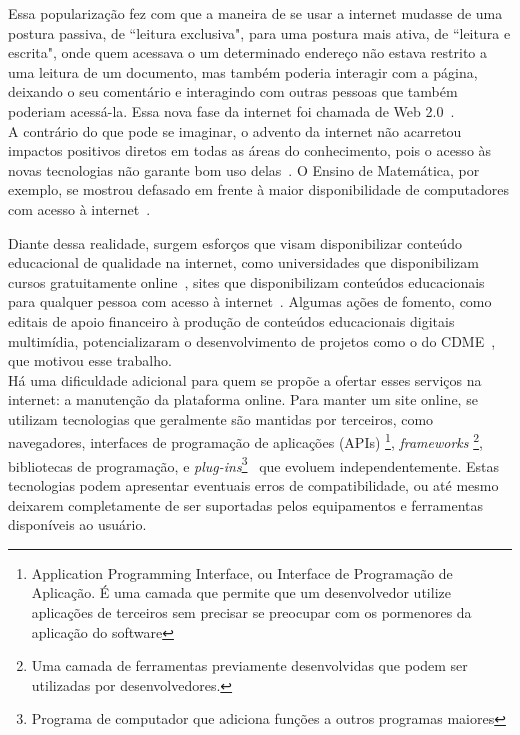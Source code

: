 Essa popularização fez com que a maneira de se usar a internet mudasse de uma postura passiva, de ``leitura exclusiva", para uma postura mais ativa, de ``leitura e escrita", onde quem acessava o um determinado endereço não estava restrito a uma leitura de um documento, mas também poderia interagir com a página, deixando o seu comentário e interagindo com outras pessoas que também poderiam acessá-la. Essa nova fase da internet foi chamada de Web 2.0~\cite{web20jones2013patterns}.\\ 
 
A contrário do que pode se imaginar, o advento da internet não acarretou impactos positivos diretos em todas as áreas do conhecimento, pois o acesso às novas tecnologias não garante bom uso delas~\cite{lei2007technology}. O Ensino de Matemática, por exemplo, se mostrou defasado em frente à maior disponibilidade de computadores com acesso à internet~\cite{cdmebortolossi2016conteudos}.

Diante dessa realidade, surgem esforços que visam disponibilizar conteúdo educacional de qualidade na internet, como universidades que disponibilizam cursos gratuitamente online~\cite{aulasunigratuitas}, sites que disponibilizam conteúdos educacionais para qualquer pessoa com acesso à internet~\cite{khanthompson2011khan}. Algumas ações de fomento, como editais de apoio financeiro à produção de conteúdos educacionais digitais multimídia, potencializaram o desenvolvimento de projetos como o do CDME~\cite{cdmebortolossi2016conteudos}, que motivou esse trabalho.
\\

Há uma dificuldade adicional para quem se propõe a ofertar esses serviços na internet: a manutenção da plataforma online. Para manter um site online, se utilizam tecnologias que geralmente são mantidas por terceiros, como navegadores, interfaces de programação de aplicações (APIs) \footnote{Application Programming Interface, ou Interface de Programação de Aplicação. É uma camada que permite que um desenvolvedor utilize aplicações de terceiros sem precisar se preocupar com os pormenores da aplicação do software}, \textit{frameworks} \footnote{Uma camada de ferramentas previamente desenvolvidas que podem ser utilizadas por desenvolvedores.}, bibliotecas de programação, e \textit{plug-ins}\footnote{Programa de computador que adiciona funções a outros programas maiores}~\cite{mckimm2006abc} que evoluem independentemente. Estas tecnologias podem apresentar eventuais erros de compatibilidade, ou até mesmo deixarem completamente de ser suportadas pelos equipamentos e ferramentas disponíveis ao usuário.

